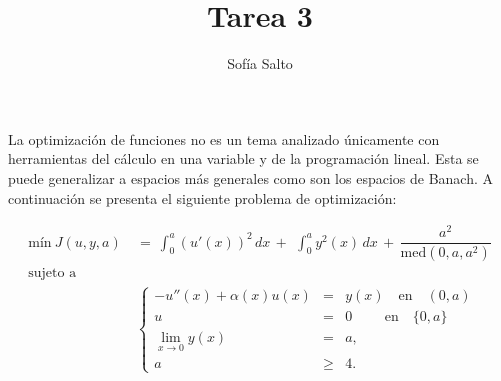 \documentclass[12pt,a4paper]{article}
\author{Sofía Salto}
\title{Tarea 3}
\begin{document}
La optimización de funciones no es un tema analizado únicamente con herramientas del cálculo en
una variable y de la programación lineal. Esta se puede generalizar a espacios más generales como
son los espacios de Banach. A continuación se presenta el siguiente problema de optimización:





\begin{equation}
\begin{array}{ll}
\text{mín} \ J(u,y,a)\ &= \ \int_{0}^{a} (u'(x))^{2} \, dx \, + \, \ \int_{0}^{a} y^{2}(x) \, dx \, + \, \dfrac{a^{2}}{\text{med}(0,a,a^{2})}\\
\text{sujeto a} & \\ \nonumber
&
\left \{
\begin{array}{rcl}
-u''(x)+\alpha(x)u(x)&=&y(x) \quad \text{en} \quad (0,a) \\
u&=& 0 \, \, \quad \quad \text{en} \quad \{0,a\} \\
\lim_{x\to 0} y(x)&=&a, \\
a &\geq & 4.
\end{array}
\right.
\end{array}
\end{equation}
\end{document}
